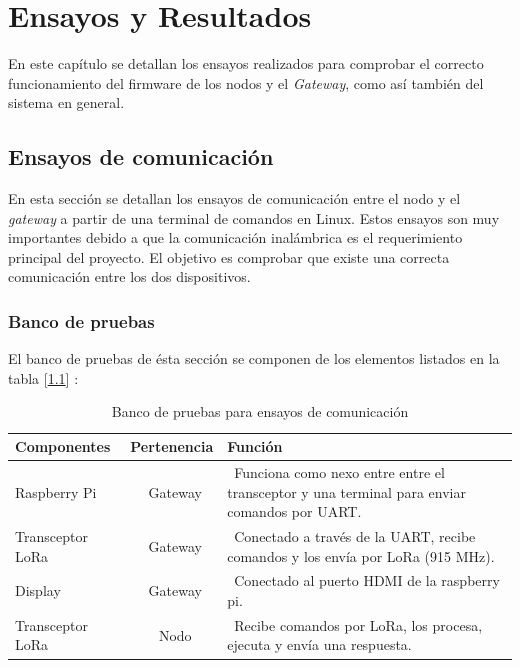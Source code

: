 
\chapter{Ensayos y Resultados} %

\label{Chapter4} %

En este capítulo se detallan los ensayos realizados para comprobar el correcto funcionamiento del firmware de los nodos y el {\textit{Gateway}}, como así también del sistema en general.

\section{Ensayos de comunicación}
\label{sec:pruebasHW}

En esta sección se detallan los ensayos de comunicación entre el nodo y el {\textit{gateway}} a partir de una terminal de comandos en Linux. Estos ensayos son muy importantes debido a que la comunicación inalámbrica es el requerimiento principal del proyecto. El objetivo es comprobar que existe una correcta comunicación entre los dos dispositivos.

\subsection{Banco de pruebas}

El banco de pruebas de ésta sección se componen de los elementos listados en la tabla [\ref{tab:bancodepruebas1}] :

\begin{table}[h]
	\centering
	\caption[Banco de pruebas 1]{Banco de pruebas para ensayos de comunicación}
	\begin{tabular}{l c m{7.5cm}}    
		\toprule
		\textbf{Componentes}  		& \textbf{Pertenencia}     	& \textbf{Función}																				\\
		\midrule
		Raspberry Pi				& \ Gateway 				& \ Funciona como nexo entre entre el transceptor y una terminal para enviar comandos por UART.	\\
		Transceptor LoRa 			& \ Gateway					& \ Conectado a través de la UART, recibe comandos y los envía por LoRa (915 MHz). 				\\
		Display	 					& \ Gateway 				& \ Conectado al puerto HDMI de la raspberry pi. 												\\
		Transceptor LoRa		 	& \ Nodo 					& \ Recibe comandos por LoRa, los procesa, ejecuta y envía una respuesta.						\\
		\bottomrule
		\hline
	\end{tabular}
	\label{tab:bancodepruebas1}
\end{table}

